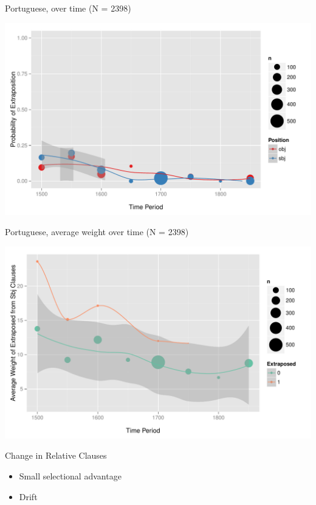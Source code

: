 \documentclass[hyperref={pdfpagelabels=false}]{beamer}
\begin{document}
\begin{frame}{Portuguese, over time (N = 2398)}

\begin{center}
\includegraphics[width=1.1\textwidth]{exSbjObjYearBinned50Loessport.pdf}
\end{center}
\end{frame}


\begin{frame}{Portuguese, average weight over time (N = 2398)}

\begin{center}
\includegraphics[width=1.1\textwidth]{exWeightYearBinned50Loessport.pdf}
\end{center}
\end{frame}




\begin{frame}{Change in Relative Clauses}
\begin{itemize}
	\item Small selectional advantage
	\item Drift \citep{moran1958}
\end{itemize}
\end{frame}
\end{document}
